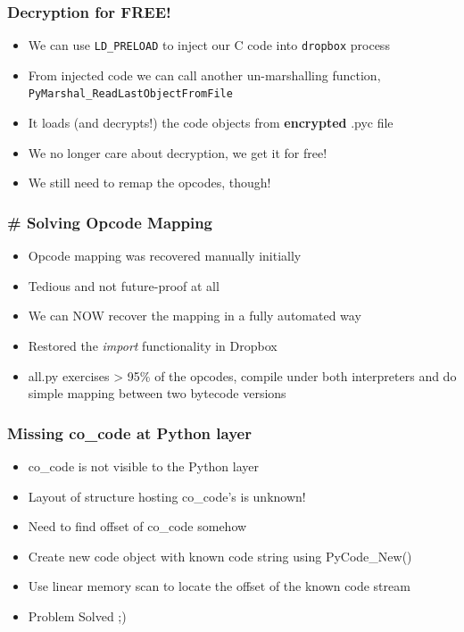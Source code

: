 \documentclass{beamer}
\begin{document}
\begin{frame}
\frametitle{Decryption for FREE!}
\begin{itemize}
\itemsep 2em
\item{We can use \texttt{LD\_PRELOAD} to inject our C code into \texttt{dropbox} process}
\item{From injected code we can call another un-marshalling function, \texttt{PyMarshal\_ReadLastObjectFromFile}}
\item{It loads (and decrypts!) the code objects from \textbf{encrypted} .pyc file}
\item{We no longer care about decryption, we get it for free!}
\item{We still need to remap the opcodes, though!}
\end{itemize}
\end{frame}

\begin{frame}
\frametitle{\# Solving Opcode Mapping}
\begin{itemize}
\itemsep 2em
\item{Opcode mapping was recovered manually initially}
\item{Tedious and not future-proof at all}
\item{We can NOW recover the mapping in a fully automated way}
\item{Restored the \emph{import} functionality in Dropbox}
\item{all.py exercises > 95\% of the opcodes, compile under both interpreters
and do simple mapping between two bytecode versions}
\end{itemize}
\end{frame}

\begin{frame}
\frametitle{Missing co\_code at Python layer}
\begin{itemize}
\itemsep 1.6em
\item{co\_code is not visible to the Python layer}
\item{Layout of structure hosting co\_code's is unknown!}
\item{Need to find offset of co\_code somehow}
\item{Create new code object with known code string using PyCode\_New()}
\item{Use linear memory scan to locate the offset of the known code stream}
\item{Problem Solved ;)}
\end{itemize}
\end{frame}
\end{document}
